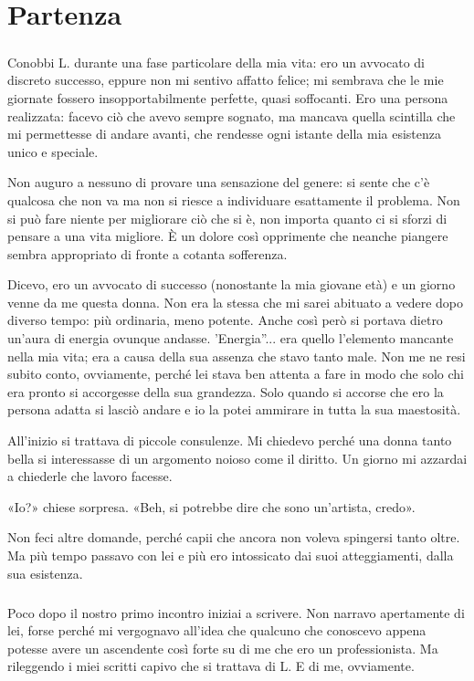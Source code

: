 \documentclass[a4paper,12pt]{book}
\begin{document}
\chapter{Partenza}

\paragraph{}
Conobbi L. durante una fase particolare della mia vita: ero un avvocato di
discreto successo, eppure non mi sentivo affatto felice; mi sembrava che le mie
giornate fossero insopportabilmente perfette, quasi soffocanti. Ero una persona
realizzata: facevo ciò che avevo sempre sognato, ma mancava quella scintilla
che mi permettesse di andare avanti, che rendesse ogni istante della mia
esistenza unico e speciale.

Non auguro a nessuno di provare una sensazione del genere: si sente che c'è
qualcosa che non va ma non si riesce a individuare esattamente il problema. Non
si può fare niente per migliorare ciò che si è, non importa quanto ci si
sforzi di pensare a una vita migliore. È un dolore così opprimente che neanche
piangere sembra appropriato di fronte a cotanta sofferenza.

Dicevo, ero un avvocato di successo (nonostante la mia giovane età) e un
giorno venne da me questa donna. Non era la stessa che mi sarei abituato a
vedere dopo diverso tempo: più ordinaria, meno potente. Anche così però si
portava dietro un'aura di energia ovunque andasse. 'Energia''... era quello
l'elemento mancante nella mia vita; era a causa della sua assenza che stavo
tanto male. Non me ne resi subito conto, ovviamente, perché lei stava ben
attenta a fare in modo che solo chi era pronto si accorgesse della sua
grandezza. Solo quando si accorse che ero la persona adatta si lasciò andare
e io la potei ammirare in tutta la sua maestosità.

All'inizio si trattava di piccole consulenze. Mi chiedevo perché una donna
tanto bella si interessasse di un argomento noioso come il diritto. Un giorno mi
azzardai a chiederle che lavoro facesse.

«Io?» chiese sorpresa. «Beh, si potrebbe dire che sono un'artista, credo».

Non feci altre domande, perché capii che ancora non voleva spingersi tanto
oltre. Ma più tempo passavo con lei e più ero intossicato dai suoi
atteggiamenti, dalla sua esistenza.

\paragraph{}
Poco dopo il nostro primo incontro iniziai a scrivere. Non narravo apertamente
di lei, forse perché mi vergognavo all'idea che qualcuno che conoscevo appena
potesse avere un ascendente così forte su di me che ero un professionista. Ma
rileggendo i miei scritti capivo che si trattava di L. E di me, ovviamente.
\end{document}
